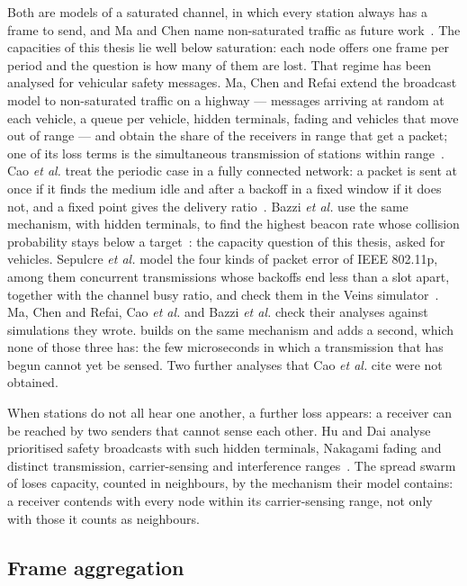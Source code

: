 Both are models of a saturated channel, in which every station always has a frame to send, and
Ma and Chen name non-saturated traffic as future work~\cite{machen2008}. The capacities of this
thesis lie well below saturation: each node offers one frame per period and the question is
how many of them are lost. That regime has been analysed for vehicular safety messages. Ma,
Chen and Refai extend the broadcast model to non-saturated traffic on a highway --- messages
arriving at random at each vehicle, a queue per vehicle, hidden terminals, fading and vehicles
that move out of range --- and obtain the share of the receivers in range that get a packet;
one of its loss terms is the simultaneous transmission of stations within
range~\cite{ma2009dsrc}. Cao \emph{et al.} treat the periodic case in a fully connected
network: a packet is sent at once if it finds the medium idle and after a backoff in a fixed
window if it does not, and a fixed point gives the delivery ratio~\cite{cao2021dsrc}. Bazzi
\emph{et al.} use the same mechanism, with hidden terminals, to find the highest beacon rate
whose collision probability stays below a target~\cite{bazzi2016beaconing}: the capacity
question of this thesis, asked for vehicles. Sepulcre \emph{et al.} model the four kinds of
packet error of IEEE 802.11p, among them concurrent transmissions whose backoffs end less than a
slot apart, together with the channel busy ratio, and check them in the Veins
simulator~\cite{sepulcre2022analytical}. Ma, Chen and Refai, Cao \emph{et al.} and Bazzi
\emph{et al.} check their analyses against simulations they wrote.  builds on the
same mechanism and adds a second, which none of those three has: the few microseconds in which a
transmission that has begun cannot yet be sensed. Two further analyses that Cao \emph{et al.} cite were not
obtained.

When stations do not all hear one another, a further loss appears: a receiver can be reached by
two senders that cannot sense each other. Hu and Dai analyse prioritised safety broadcasts with
such hidden terminals, Nakagami fading and distinct transmission, carrier-sensing and
interference ranges~\cite{hu2020hidden}. The spread swarm of  loses
capacity, counted in neighbours, by the mechanism their model contains: a receiver contends with
every node within its carrier-sensing range, not only with those it counts as neighbours.

\subsection{Frame aggregation}\label{sec:bg-aggregation}

